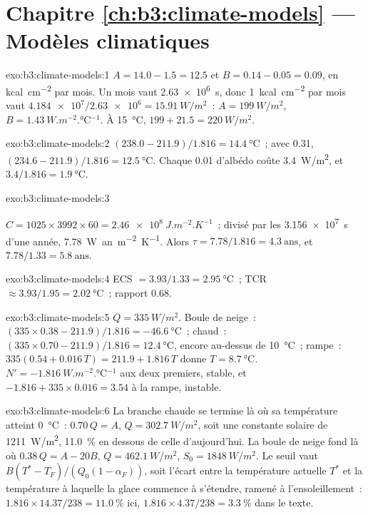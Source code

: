 \section*{Chapitre \ref{ch:b3:climate-models} --- Modèles climatiques}

\begin{solution}{exo:b3:climate-models:1}
$A = 14.0 - 1.5 = \num{12.5}$ et $B = 0.14 - 0.05 = \num{0.09}$, en
\unit{kcal.cm^{-2}} par mois. Un mois vaut \qty{2.63e6}{s}, donc
\qty{1}{kcal.cm^{-2}} par mois vaut $\num{4.184e7}/\num{2.63e6} =
\qty{15.91}{W/m^2}$~: $A = \qty{199}{W/m^2}$, $B =
\qty{1.43}{W.m^{-2}.\celsius^{-1}}$. À \qty{15}{\celsius}, $199 + 21.5 =
\qty{220}{W/m^2}$.
\end{solution}

\begin{solution}{exo:b3:climate-models:2}
$(238.0 - 211.9)/1.816 = \qty{14.4}{\celsius}$~; avec 0.31, $(234.6 -
211.9)/1.816 = \qty{12.5}{\celsius}$. Chaque 0.01 d'albédo coûte
\qty{3.4}{W/m^2}, et $3.4/1.816 = \qty{1.9}{\celsius}$.
\end{solution}

\begin{solution}{exo:b3:climate-models:3}
{\sloppy $C = 1025\times3992\times60 = \qty{2.46e8}{J.m^{-2}.K^{-1}}$~; divisé par
les \qty{3.156e7}{s} d'une année, \qty{7.78}{W.an.m^{-2}.K^{-1}}. Alors $\tau
= 7.78/1.816 = \num{4.3}~\text{ans}$, et $7.78/1.33 = \num{5.8}~\text{ans}$.\par}
\end{solution}

\begin{solution}{exo:b3:climate-models:4}
ECS $= 3.93/1.33 = \qty{2.95}{\celsius}$~; TCR $\approx 3.93/1.95 =
\qty{2.02}{\celsius}$~; rapport \num{0.68}.
\end{solution}

\begin{solution}{exo:b3:climate-models:5}
$Q = \qty{335}{W/m^2}$. Boule de neige~: $(335\times0.38 - 211.9)/1.816 =
\qty{-46.6}{\celsius}$~; chaud~: $(335\times0.70 - 211.9)/1.816 =
\qty{12.4}{\celsius}$, encore au-dessus de \qty{10}{\celsius}~; rampe~: $335(0.54 +
0.016\,T) = 211.9 + 1.816\,T$ donne $T = \qty{8.7}{\celsius}$. $N' =
\qty{-1.816}{W.m^{-2}.\celsius^{-1}}$ aux deux premiers, stable, et $-1.816
+ 335\times0.016 = \num{+3.54}$ à la rampe, instable.
\end{solution}

\begin{solution}{exo:b3:climate-models:6}
La branche chaude se termine là où sa température atteint \qty{0}{\celsius}~:
$0.70\,Q = A$, $Q = \qty{302.7}{W/m^2}$, soit une constante solaire de
\qty{1211}{W/m^2}, \qty{11.0}{\percent} en dessous de celle d'aujourd'hui. La boule de neige fond
là où $0.38\,Q = A - 20B$, $Q = \qty{462.1}{W/m^2}$, $S_0 =
\qty{1848}{W/m^2}$. Le seuil vaut $B(T^* - T_F)/(Q_0(1 - \alpha_F))$,
soit l'écart entre la température actuelle $T^*$ et la température à laquelle la
glace commence à s'étendre, ramené à l'ensoleillement~: $1.816\times14.37/238 =
\qty{11.0}{\percent}$ ici, $1.816\times4.37/238 = \qty{3.3}{\percent}$ dans
le texte.
\end{solution}

